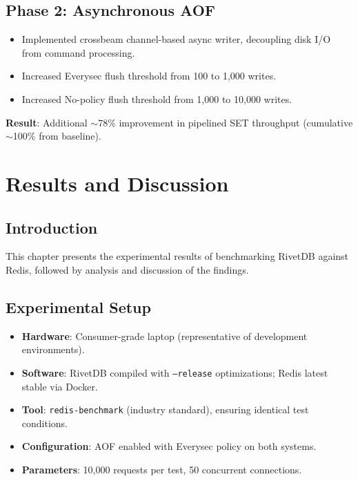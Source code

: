 \documentclass[12pt,a4paper]{report}
\begin{document}
\section{Phase 2: Asynchronous AOF}

\begin{itemize}[leftmargin=2.5em]
    \item Implemented crossbeam channel-based async writer, decoupling disk I/O from command processing.
    \item Increased Everysec flush threshold from 100 to 1,000 writes.
    \item Increased No-policy flush threshold from 1,000 to 10,000 writes.
\end{itemize}

\textbf{Result}: Additional $\sim$78\% improvement in pipelined SET throughput (cumulative $\sim$100\% from baseline).

\chapter{Results and Discussion}

\section{Introduction}

This chapter presents the experimental results of benchmarking RivetDB against Redis, followed by analysis and discussion of the findings.

\section{Experimental Setup}

\begin{itemize}[leftmargin=2.5em]
    \item \textbf{Hardware}: Consumer-grade laptop (representative of development environments).
    \item \textbf{Software}: RivetDB compiled with \texttt{--release} optimizations; Redis latest stable via Docker.
    \item \textbf{Tool}: \texttt{redis-benchmark} (industry standard), ensuring identical test conditions.
    \item \textbf{Configuration}: AOF enabled with Everysec policy on both systems.
    \item \textbf{Parameters}: 10,000 requests per test, 50 concurrent connections.
\end{itemize}
\end{document}
